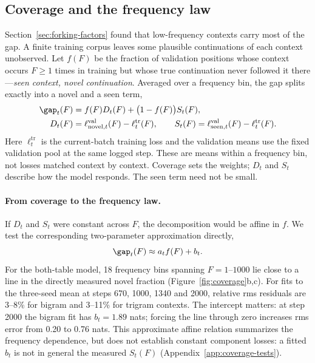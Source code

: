 \subsection{Coverage and the frequency law}
\label{sec:coverage}
Section~\ref{sec:forking-factors} found that low-frequency contexts carry most of the gap. A finite training corpus leaves some plausible continuations of each context unobserved. Let $f(F)$ be the fraction of validation positions whose context occurs $F\ge1$ times in training but whose true continuation never followed it there---\emph{seen context, novel continuation}. Averaged over a frequency bin, the gap splits exactly into a novel and a seen term,
\begin{equation}
\begin{aligned}
\gap_t(F)&=f(F)D_t(F)+\big(1-f(F)\big)S_t(F),\\
D_t(F)&=\ell^{\mathrm{val}}_{\mathrm{novel},t}(F)-\ell^{\mathrm{tr}}_t(F),\qquad
S_t(F)=\ell^{\mathrm{val}}_{\mathrm{seen},t}(F)-\ell^{\mathrm{tr}}_t(F).
\end{aligned}
\label{eq:gap-decomp}
\end{equation}
Here $\ell^{\mathrm{tr}}_t$ is the current-batch training loss and the validation means use the fixed validation pool at the same logged step. These are means within a frequency bin, not losses matched context by context. Coverage sets the weights; $D_t$ and $S_t$ describe how the model responds. The seen term need not be small.

\paragraph{From coverage to the frequency law.}
If $D_t$ and $S_t$ were constant across $F$, the decomposition would be affine in $f$. We test the corresponding two-parameter approximation directly,
\begin{equation}
\gap_t(F)\approx a_t f(F)+b_t.
\label{eq:gap_j}
\end{equation}
For the both-table model, 18 frequency bins spanning $F=1$--$1000$ lie close to a line in the directly measured novel fraction (Figure~\ref{fig:coverage}b,c). For fits to the three-seed mean at steps 670, 1000, 1340 and 2000, relative rms residuals are 3--8\% for bigram and 3--11\% for trigram contexts. The intercept matters: at step 2000 the bigram fit has $b_t=1.89$ nats; forcing the line through zero increases rms error from 0.20 to 0.76 nats. This approximate affine relation summarizes the frequency dependence, but does not establish constant component losses: a fitted $b_t$ is not in general the measured $S_t(F)$ (Appendix~\ref{app:coverage-tests}).

